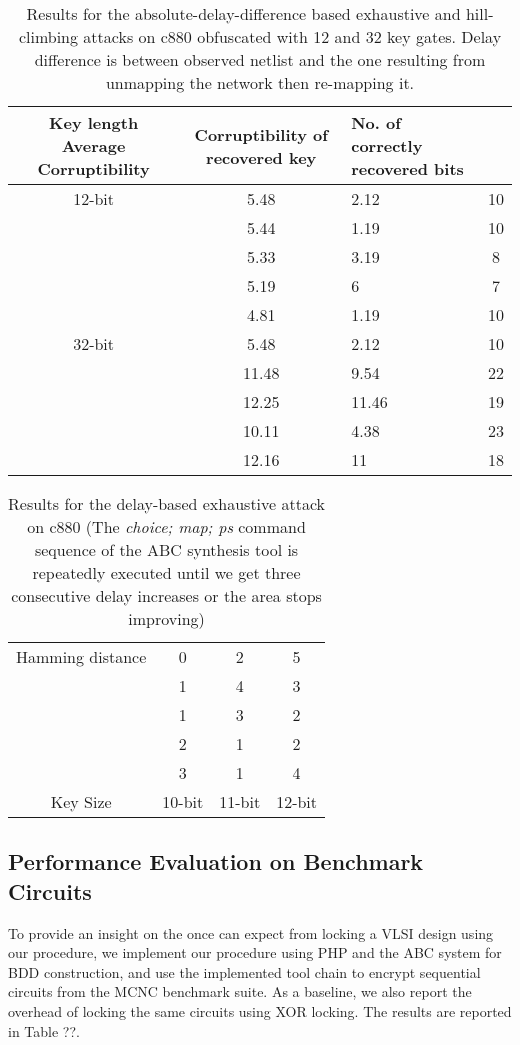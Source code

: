 \begin{table*}
\caption{Results for the absolute-delay-difference based exhaustive and hill-climbing attacks on c880 obfuscated with 12 and 32 key gates. Delay difference is between observed netlist and the one resulting from unmapping the network then re-mapping it. }
\begin{tabular}{ | c | c | p{5cm} | c | }
\hline
Key length Average Corruptibility  & Corruptibility of recovered key  & No. of correctly recovered bits \\
\hline
12-bit & 5.48 & 2.12 & 10\\

& 5.44 & 1.19 & 10\\

& 5.33 & 3.19 & 8\\

& 5.19 & 6 & 7\\

& 4.81 & 1.19 & 10\\
\hline
32-bit & 5.48 & 2.12 & 10\\

& 11.48 & 9.54 & 22\\

& 12.25 & 11.46 & 19\\

& 10.11 & 4.38 & 23\\

& 12.16 & 11 & 18\\
\hline
\end{tabular}
\end{table*}

\begin{table}
\caption{Results for the delay-based exhaustive attack on c880 (The \emph{choice; map; ps} command sequence of the ABC synthesis tool is repeatedly executed until we get three consecutive delay increases or the area stops improving)}
\begin{tabular}{ | c | c | c | c | }
\hline
Hamming distance & 0 & 2 & 5 \\
&1& 4 & 3 \\
&1& 3 & 2 \\
&2& 1 & 2 \\
&3& 1 & 4 \\
\hline
Key Size & 10-bit & 11-bit & 12-bit \\
\hline
\end{tabular}
\end{table}

\subsection{Performance Evaluation on Benchmark Circuits}
To provide an insight on the once can expect from locking a VLSI design using our procedure, we implement our procedure using PHP and the ABC system \cite{} for BDD construction, and use the implemented tool chain to encrypt sequential circuits from the MCNC benchmark suite. As a baseline, we also report the overhead of locking the same circuits using XOR locking. The results are reported in Table ??.

